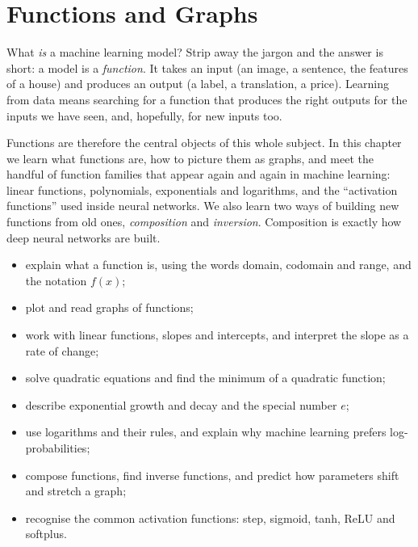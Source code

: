 \chapter{Functions and Graphs}\label{ch:functions}

\begin{motivation}
What \emph{is} a machine learning model? Strip away the jargon and the answer
is short: a model is a \emph{function}. It takes an input (an image, a
sentence, the features of a house) and produces an output (a label, a
translation, a price). Learning from data means searching for a function that
produces the right outputs for the inputs we have seen, and, hopefully, for
new inputs too.

Functions are therefore the central objects of this whole subject. In this
chapter we learn what functions are, how to picture them as graphs, and meet
the handful of function families that appear again and again in machine
learning: linear functions, polynomials, exponentials and logarithms, and the
``activation functions'' used inside neural networks. We also learn two ways
of building new functions from old ones, \emph{composition} and
\emph{inversion}. Composition is exactly how deep neural networks are built.
\end{motivation}

\begin{objectives}
\begin{itemize}
  \item explain what a function is, using the words domain, codomain and range,
    and the notation $f(x)$;
  \item plot and read graphs of functions;
  \item work with linear functions, slopes and intercepts, and interpret the
    slope as a rate of change;
  \item solve quadratic equations and find the minimum of a quadratic function;
  \item describe exponential growth and decay and the special number $e$;
  \item use logarithms and their rules, and explain why machine learning
    prefers log-probabilities;
  \item compose functions, find inverse functions, and predict how parameters
    shift and stretch a graph;
  \item recognise the common activation functions: step, sigmoid, tanh, ReLU
    and softplus.
\end{itemize}
\end{objectives}

